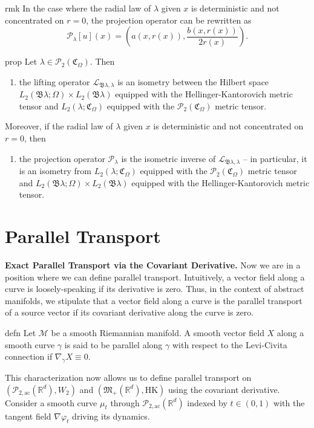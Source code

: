 \documentclass[11pt]{article}
\newcommand{\man}{\mathcal{M}}
\newcommand{\pac}{\mathcal{P}_{2, \text{ac}}(\mathbb{R}^d)}
\newcommand{\posm}{\mathfrak{M}_+(\mathbb{R}^d)}
\begin{document}
\begin{restatable}{rmk}{} \label{deterministic vector projection}
    In the case where the radial law of $\lambda$ given $x$ is deterministic and not concentrated on $r = 0$, the projection operator can be rewritten as 
    \[\mathcal{P}_\lambda[u](x) = \left(a(x, r(x)), \frac{b(x, r(x))}{2r(x)}\right).\]
\end{restatable}

\begin{restatable}{prop}{} \label{isometry}
    Let $\lambda \in \mathcal{P}_2(\mathfrak{C}_\Omega).$ Then
    \begin{enumerate}[label=(\alph*)]
        \item the lifting operator $\mathcal{L}_{\mathfrak{B}\lambda, \lambda}$ is an isometry between the Hilbert space $L_2(\mathfrak{B}\lambda; \Omega) \times L_2(\mathfrak{B}\lambda)$ equipped with the Hellinger-Kantorovich metric tensor and $L_2(\lambda; \mathfrak{C}_\Omega)$ equipped with the $\mathcal{P}_2(\mathfrak{C}_\Omega)$ metric tensor.
    \end{enumerate}  Moreover, if the radial law of $\lambda$ given $x$ is deterministic and not concentrated on $r = 0$, then 
    \begin{enumerate}[resume*]
        \item the projection operator $\mathcal{P}_\lambda$ is the isometric inverse of $\mathcal{L}_{\mathfrak{B}\lambda, \lambda}$ -- in particular, it is an isometry from $L_2(\lambda; \mathfrak{C}_\Omega)$ equipped with the $\mathcal{P}_2(\mathfrak{C}_\Omega)$ metric tensor and $L_2(\mathfrak{B}\lambda; \Omega) \times L_2(\mathfrak{B}\lambda)$ equipped with the Hellinger-Kantorovich metric tensor. 
    \end{enumerate}
\end{restatable}

\section{Parallel Transport}

\textbf{Exact Parallel Transport via the Covariant Derivative.} Now we are in a position where we can define parallel transport. Intuitively, a vector field along a curve is  loosely-speaking if its derivative is zero. Thus, in the context of abstract manifolds, we stipulate that a vector field along a curve is the parallel transport of a source vector if its covariant derivative along the curve is zero.
\begin{restatable}{defn}{} \label{parallel transport on general manifolds}
    Let $\man$ be a smooth Riemannian manifold. A smooth vector field $X$ along a smooth curve $\gamma$ is said to be parallel along $\gamma$ with respect to the Levi-Civita connection if $\nabla_{\dot \gamma}X \equiv 0$.
\end{restatable}
This characterization now allows us to define parallel transport on $(\pac, W_2)$ and $(\posm, \text{HK})$ using the covariant derivative. Consider a smooth curve $\mu_t$ through $\pac$ indexed by $t \in (0, 1)$ with the tangent field $\nabla \varphi_t$ driving its dynamics. 
\end{document}
